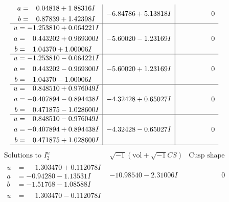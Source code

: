 \documentclass[1p]{elsarticle_modified}
\theoremstyle{definition}
\newcommand{\I}{\sqrt{-1}}
\begin{document}
$$\begin{array}{c|c|c}
\begin{aligned}
a &= \phantom{-}0.04818 + 1.88316 I \\
b &= \phantom{-}0.87839 + 1.42398 I\end{aligned}
 & -6.84786 + 5.13818 I & \phantom{-0.000000 } 0 \\ \hline\begin{aligned}
u &= -1.253810 + 0.064221 I \\
a &= \phantom{-}0.443202 + 0.969300 I \\
b &= \phantom{-}1.04370 + 1.00006 I\end{aligned}
 & -5.60020 - 1.23169 I & \phantom{-0.000000 } 0 \\ \hline\begin{aligned}
u &= -1.253810 - 0.064221 I \\
a &= \phantom{-}0.443202 - 0.969300 I \\
b &= \phantom{-}1.04370 - 1.00006 I\end{aligned}
 & -5.60020 + 1.23169 I & \phantom{-0.000000 } 0 \\ \hline\begin{aligned}
u &= \phantom{-}0.848510 + 0.976049 I \\
a &= -0.407894 - 0.894438 I \\
b &= \phantom{-}0.471875 - 1.028600 I\end{aligned}
 & -4.32428 + 0.65027 I & \phantom{-0.000000 } 0 \\ \hline\begin{aligned}
u &= \phantom{-}0.848510 - 0.976049 I \\
a &= -0.407894 + 0.894438 I \\
b &= \phantom{-}0.471875 + 1.028600 I\end{aligned}
 & -4.32428 - 0.65027 I & \phantom{-0.000000 } 0\\
 \hline 
 \end{array}$$\newpage$$\begin{array}{c|c|c}  
\text{Solutions to }I^u_{2}& \I (\text{vol} + \sqrt{-1}CS) & \text{Cusp shape}\\
 \hline 
\begin{aligned}
u &= \phantom{-}1.303470 + 0.112078 I \\
a &= -0.94280 - 1.13531 I \\
b &= -1.51768 - 1.08588 I\end{aligned}
 & -10.98540 - 2.31006 I & \phantom{-0.000000 } 0 \\ \hline\begin{aligned}
u &= \phantom{-}1.303470 - 0.112078 I \\

\end{aligned}
\end{array}$$
\end{document}
